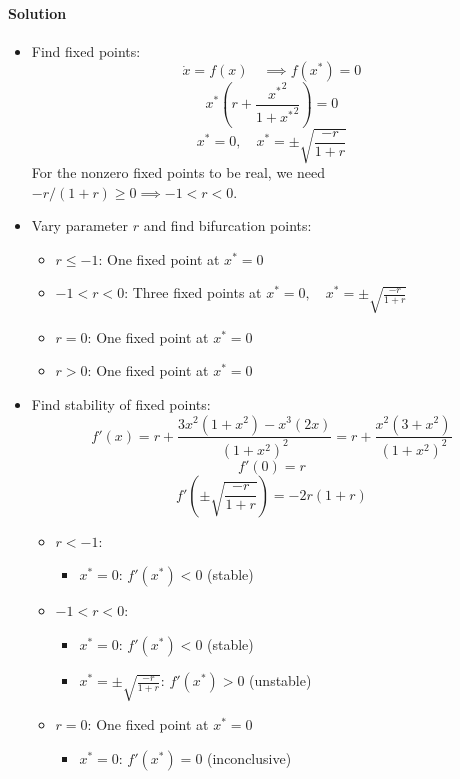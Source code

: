 \documentclass[11pt]{article}
\begin{document}
\begin{enumerate}
    \paragraph{Solution}\mbox{} 
    \begin{itemize}
        \item Find fixed points:
        \[\dot{x} = f(x)\quad \implies f(x^*) = 0\]
        \[x^*\left(r + \frac{{x^*}^2}{1+{x^*}^2}\right) = 0\]
        \[x^*=0,\quad x^* = \pm \sqrt{\frac{-r}{1+r}}\]
        For the nonzero fixed points to be real, we need $-r/(1+r) \geq 0 \implies -1<r<0$.
        \item Vary parameter $r$ and find bifurcation points:
        \begin{itemize}
            \item $r\leq-1$: One fixed point at $x^*=0$  
            \item $-1<r<0$: Three fixed points at $x^*=0,\quad x^* = \pm \sqrt{\frac{-r}{1+r}}$
            \item $r=0$: One fixed point at $x^*=0$ 
            \item $r>0$: One fixed point at $x^*=0$ 
        \end{itemize}
        \item Find stability of fixed points:
        \[f'(x) = r + \frac{3x^2(1+x^2)-x^3(2x)}{(1+x^2)^2} = r+\frac{x^2(3+x^2)}{(1+x^2)^2}\]
        \[f'(0) = r\]
        \[f'\left(\pm \sqrt{\frac{-r}{1+r}}\right) = -2r(1+r)\]
            \begin{itemize}
            \item $r<-1$: 
            \begin{itemize}
                \item $x^* = 0$: $f'(x^*)<0$ (stable)
            \end{itemize} 
            \item $-1<r<0$: 
            \begin{itemize}
                \item $x^* = 0$: $f'(x^*)<0$ (stable)
                \item $x^* = \pm \sqrt{\frac{-r}{1+r}}$: $f'(x^*)>0$ (unstable)
            \end{itemize} 
            \item $r=0$: One fixed point at $x^*=0$ 
            \begin{itemize}
                \item $x^* = 0$: $f'(x^*)=0$ (inconclusive)
            \end{itemize}

\end{itemize}
\end{itemize}
\end{enumerate}
\end{document}
